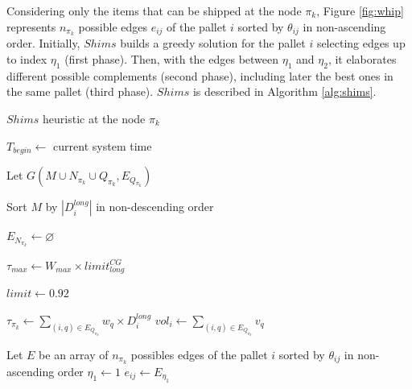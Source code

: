 \documentclass[preprint]{elsarticle}
\begin{document}
Considering only the items that can be shipped at the node $\pi_k$, Figure \ref{fig:whip} represents $n_{\pi_k}$\/ possible edges $e_{ij}$\/ of the pallet $i$\/ sorted by $\theta_{ij}$\/ in non-ascending order. Initially, $Shims$\/ builds a greedy solution for the pallet $i$\/ selecting edges up to index $\eta_1$ (first phase). Then, with the edges between $\eta_1$\/ and $\eta_2$, it elaborates different possible complements (second phase), including later the best ones in the same pallet (third phase). $Shims$\/ is described in Algorithm \ref{alg:shims}. 




\begin{algorithm}[H]
	\caption{$Shims$\/ heuristic at the node $\pi_k$}  \label{alg:shims}
	\begin{algorithmic}[1]
		
	
		\State $T_{begin} \gets$ current system time
	
		\State Let $G(M \cup N_{\pi_k} \cup Q_{\pi_k}, E_{Q_{\pi_k}})$   \label{shims:initQ}
		
		\State Sort $M$ by $|D_i^{long}|$ in non-descending order \label{shims:pallets}
		
		\State $E_{N_{\pi_k}} \gets \varnothing$  
				
		\State $\tau_{max} \gets W_{max} \times limit^{CG}_{long}$ 

		\State $limit \gets 0.92$  \label{shims:limit}
		
		  \label{shims:eta1_a}
							
			\State $\tau_{\pi_k} \gets \sum_{(i,q)\in E_{Q_{\pi_k}}} w_q \times D_i^{long}$ 	
			\State $vol_i \gets \sum_{(i,q)\in E_{Q_{\pi_k}}} v_q$ 	
			
			\State Let $E$\/ be an array of $n_{\pi_k}$ possibles edges of the pallet $i$\/ sorted by $\theta_{ij}$\/ in non-ascending order \label{shims:possible}
			\State $\eta_1 \gets 1$  
			\Repeat
				\State $e_{ij} \gets E_{\eta_1}$ 
								
				

\end{algorithmic}
\end{algorithm}
\end{document}
